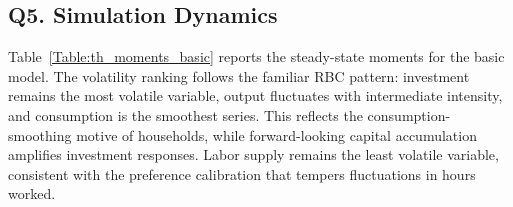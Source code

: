 \documentclass[a4paper,12pt]{article} %
\theoremstyle{nonitalic}
\begin{document}

\subsection*{Q5. Simulation Dynamics}

Table~\ref{Table:th_moments_basic} reports the steady-state moments for the basic model.
The volatility ranking follows the familiar RBC pattern: investment remains the most volatile variable,
output fluctuates with intermediate intensity, and consumption is the smoothest series.
This reflects the consumption-smoothing motive of households, while forward-looking capital accumulation
amplifies investment responses. Labor supply remains the least volatile variable, consistent with the
preference calibration that tempers fluctuations in hours worked.



\end{document}
